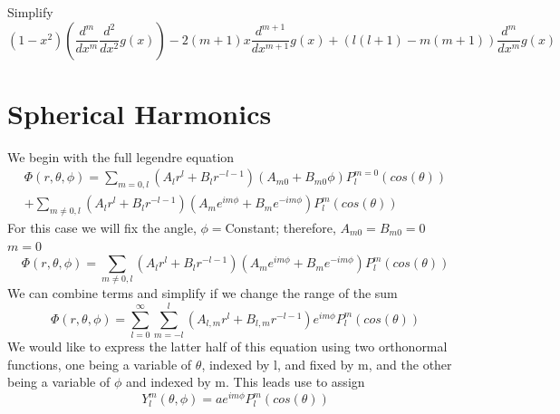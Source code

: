 \documentclass[12pt]{article}
\begin{document}
    Simplify
    \begin{equation} \label{eq: 7.6}
        (1-x^2) (\frac{d^m}{dx^m} \frac{d^2}{dx^2} g(x)) - 2(m+1)x \frac{d^{m+1}}{dx^{m+1}} g(x) + (l(l+1) - m(m+1)) \frac{d^m}{dx^m} g(x)
    \end{equation}

\section{Spherical Harmonics}
    We begin with the full legendre equation
    \begin{equation} \label{eq: 8.1}
        \begin{split}
        \Phi(r,\theta, \phi) = \sum_{m=0,l} (A_l r^l + B_l r^{-l-1}) (A_{m0} + B_{m0}\phi) P_l^{m=0}(cos(\theta)) 
        \\+ \sum_{m\neq0, l} (A_l r^l + B_l r^{-l-1}) (A_m e^{i m \phi} + B_m e^{-i m \phi}) P_l^m (cos(\theta))
        \end{split}
    \end{equation}    
    For this case we will fix the angle, $\phi = $Constant; therefore, $A_{m0} = B_{m0} = 0$
    \newline $m=0$
    \begin{equation} \label{eq: 8.2}
        \Phi(r,\theta, \phi) = \sum_{m\neq0, l} (A_l r^l + B_l r^{-l-1}) (A_m e^{i m \phi} + B_m e^{-i m \phi}) P_l^m (cos(\theta))
    \end{equation}        
    We can combine terms and simplify if we change the range of the sum
    \begin{equation} \label{eq: 8.3}
        \Phi(r,\theta, \phi) = \sum_{l=0}^{\infty} \sum_{m=-l}^l (A_{l,m} r^l + B_{l,m} r^{-l-1}) e^{i m \phi} P_l^m (cos(\theta))
    \end{equation}            
    We would like to express the latter half of this equation using two orthonormal functions, one being a variable of $\theta$, indexed by l, and fixed by m, and the other being a variable of $\phi$ and indexed by m. This leads use to assign 
    \begin{equation} \label{eq: 8.4}
        Y_{l}^{m}(\theta, \phi) = a e^{i m \phi} P_l^m (cos(\theta))
    \end{equation}
\end{document}
